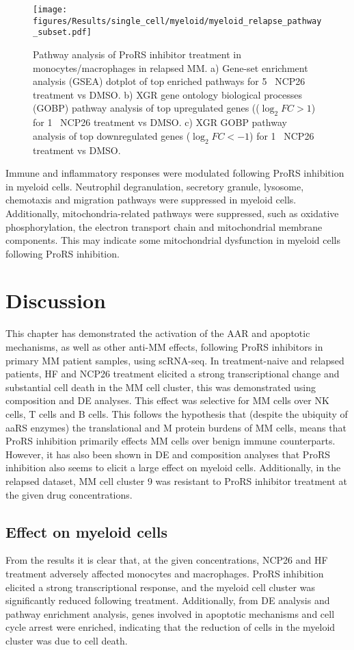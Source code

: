 \begin{figure}[htb]
\centering
\texttt{[image: figures/Results/single\_cell/myeloid/myeloid\_relapse\_pathway\_subset.pdf]}
\caption[scRNA-seq myeloid cell pathway analysis- relapsed MM]{Pathway analysis of ProRS inhibitor treatment in monocytes/macrophages in relapsed MM.
a) Gene-set enrichment analysis (GSEA) dotplot of top enriched pathways for 5\si{\micro\Molar} NCP26 treatment vs DMSO.
b) XGR gene ontology biological processes (GOBP) pathway analysis of top upregulated genes (($\log_{2}FC >1$) for 1\si{\micro\Molar} NCP26 treatment vs DMSO.
c) XGR GOBP pathway analysis of top downregulated genes ($\log_{2}FC < -1$) for 1\si{\micro\Molar} NCP26 treatment vs DMSO.
}
\label{fig:myeloid_pathway_relapsed}
\end{figure}
Immune and inflammatory responses were modulated following ProRS inhibition in myeloid cells.
Neutrophil degranulation, secretory granule, lysosome, chemotaxis and migration pathways were suppressed in myeloid cells.
Additionally, mitochondria-related pathways were suppressed, such as oxidative phosphorylation, the electron transport chain and mitochondrial membrane components.
This may indicate some mitochondrial dysfunction in myeloid cells following ProRS inhibition.


\section{Discussion}
This chapter has demonstrated the activation of the AAR and apoptotic mechanisms, as well as other anti-MM effects, following ProRS inhibitors in primary MM patient samples, using scRNA-seq.
In treatment-naive and relapsed patients, HF and NCP26 treatment elicited a strong transcriptional change and substantial cell death in the MM cell cluster, this was demonstrated using composition and DE analyses.
This effect was selective for MM cells over NK cells, T cells and B cells.
This follows the hypothesis that (despite the ubiquity of aaRS enzymes) the translational and M protein burdens of MM cells, means that ProRS inhibition primarily effects MM cells over benign immune counterparts.
However, it has also been shown in DE and composition analyses that ProRS inhibition also seems to elicit a large effect on myeloid cells.
Additionally, in the relapsed dataset, MM cell cluster 9 was resistant to ProRS inhibitor treatment at the given drug concentrations.

\subsection{Effect on myeloid cells}
From the results it is clear that, at the given concentrations,  NCP26 and HF treatment adversely affected monocytes and macrophages.
ProRS inhibition elicited a strong transcriptional response, and the myeloid cell cluster was significantly reduced following treatment.
Additionally, from DE analysis and pathway enrichment analysis, genes involved in apoptotic mechanisms and cell cycle arrest were enriched, indicating that the reduction of cells in the myeloid cluster was due to cell death.

